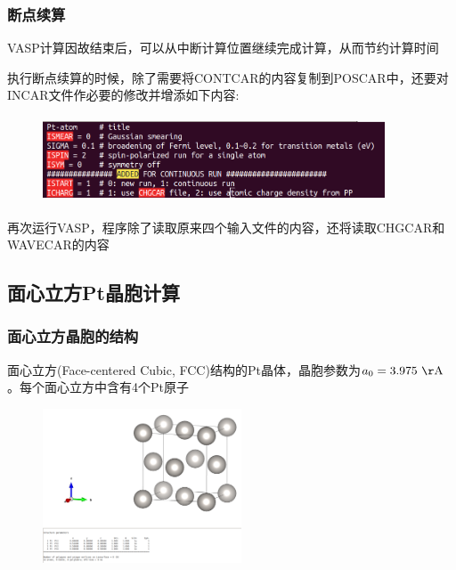 \frame
{
	\frametitle{断点续算}
\textrm{VASP}计算因故结束后，可以从中断计算位置继续完成计算，从而节约计算时间

执行断点续算的时候，除了需要将\textrm{CONTCAR}的内容复制到\textrm{POSCAR}中，还要对\textrm{INCAR}文件作必要的修改并增添如下内容:
\begin{figure}[h!]
\centering
\vskip -5pt
\includegraphics[height=1.0in,width=4.0in,viewport=0 0 700 157,clip]{Figures/Pt_atom-continurun.png}
\caption{\fontsize{6.2pt}{5.2pt}}%
\label{Pt_atom:continuruntime}
\end{figure}
再次运行\textrm{VASP}，程序除了读取原来四个输入文件的内容，还将读取\textrm{CHGCAR}和\textrm{WAVECAR}的内容%
}
\subsection{面心立方{\rm Pt}晶胞计算}\label{Sec:FCC-Pt}
\frame
{
	\frametitle{面心立方晶胞的结构}
	面心立方\textrm{(Face-centered Cubic, FCC)}结构的\textrm{Pt}晶体，晶胞参数为$a_0=3.975~\mathrm{\AA}$。每个面心立方中含有4个\textrm{Pt}原子
\begin{figure}[h!]
\centering
\includegraphics[height=1.8in,viewport=350 210 840 640,clip]{Figures/VASP_train-FCC.png}
\caption{\fontsize{6.2pt}{5.2pt}}%
\label{Pt_FCC:structure}
\end{figure}
}

